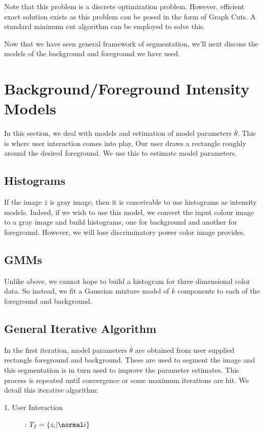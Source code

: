 \documentclass[a4paper]{article}
\begin{document}
Note that this problem is a discrete optimization problem. 
However, efficient exact solution exists as this problem can be posed in the form of Graph Cuts.
A standard minimum cut algorithm \cite{2,3} can be employed to solve this.

Now that we have seen general framework of segmentation, we'll next discuss the models of the background and foreground we have used.

\section{Background/Foreground Intensity Models}
In this section, we deal with models and estimation of model parameters $\bar{\theta}$. This is where user interaction comes into play. Our user draws a rectangle roughly around the desired foreground. We use this to estimate model parameters.

\subsection{Histograms}
If the image $\bar{z}$ is gray image, then it is conceivable to use histograms as intensity models. Indeed, if we wish to use this model, we convert the input colour image to a gray image and build histograms, one for background and another for foreground. 
However, we will lose discriminatory power color image provides.

\subsection{GMMs}
Unlike above, we cannot hope to build a histogram for three dimensional color data. 
So instead, we fit a Gaussian mixture model of $k$ components to each of the foreground and background. 

\subsection{General Iterative Algorithm}
In the first iteration, model parameters $\bar{\theta}$ are obtained from user supplied rectangle foreground and background. 
These are used to segment the image and this segmentation is in turn used to improve the parameter estimates. This process is repeated until convergence or some maximum iterations are hit.
We detail this iterative algorithm:
\begin{description}
\item[1. User Interaction]:
$T_f = \{z_i | \normal i  \}$
\end{description}
\end{document}
